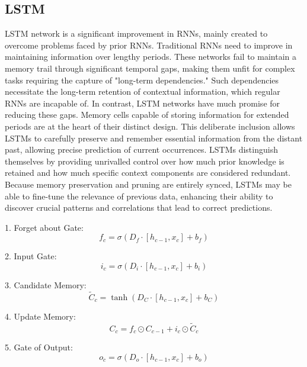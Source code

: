 \subsection{LSTM}
LSTM network is a significant improvement in RNNs, mainly created to overcome problems faced by prior RNNs. Traditional RNNs need to improve in maintaining information over lengthy periods. These networks fail to maintain a memory trail through significant temporal gaps, making them unfit for complex tasks requiring the capture of "long-term dependencies." Such dependencies necessitate the long-term retention of contextual information, which regular RNNs are incapable of. In contrast, LSTM networks have much promise for reducing these gaps. Memory cells capable of storing information for extended periods are at the heart of their distinct design\cite{abdel2020reliable}. This deliberate inclusion allows LSTMs to carefully preserve and remember essential information from the distant past, allowing precise prediction of current occurrences. LSTMs distinguish themselves by providing unrivalled control over how much prior knowledge is retained and how much specific context components are considered redundant. Because memory preservation and pruning are entirely synced, LSTMs may be able to fine-tune the relevance of previous data, enhancing their ability to discover crucial patterns and correlations that lead to correct predictions\cite{shireen2018iterative}.



1. Forget about Gate:
\begin{equation}
f_c = \sigma(D_f \cdot [h_{c-1}, x_c] + b_f)
\end{equation}

2. Input Gate:
\begin{equation}
i_c = \sigma(D_i \cdot [h_{c-1}, x_c] + b_i)
\end{equation}

3. Candidate Memory:
\begin{equation}
\tilde{C}_c = \tanh(D_C \cdot [h_{c-1}, x_c] + b_C)
\end{equation}

4. Update Memory:
\begin{equation}
C_c = f_c \odot C_{c-1} + i_c \odot \tilde{C}_c
\end{equation}

5. Gate of Output:
\begin{equation}
o_c = \sigma(D_o \cdot [h_{c-1}, x_c] + b_o)
\end{equation}

